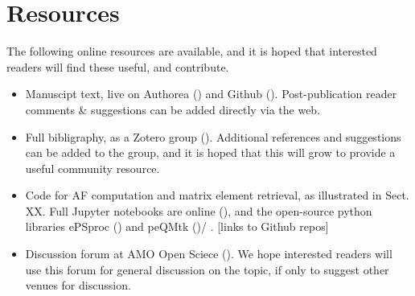 \section{Resources}

The following online resources are available, and it is hoped that interested readers will find these useful, and contribute.

\begin{itemize}
\item Manuscipt text, live on Authorea () and Github (). Post-publication reader comments \& suggestions can be added directly via the web.
\item Full bibligraphy, as a Zotero group (). Additional references and suggestions can be added to the group, and it is hoped that this will grow to provide a useful community resource.
\item Code for AF computation and matrix element retrieval, as illustrated in Sect. XX. Full Jupyter notebooks are online (), and the open-source python libraries ePSproc () and peQMtk ()/ . [links to Github repos]
\item Discussion forum at AMO Open Sciece (). We hope interested readers will use this forum for general discussion on the topic, if only to suggest other venues for discussion.
\end{itemize}